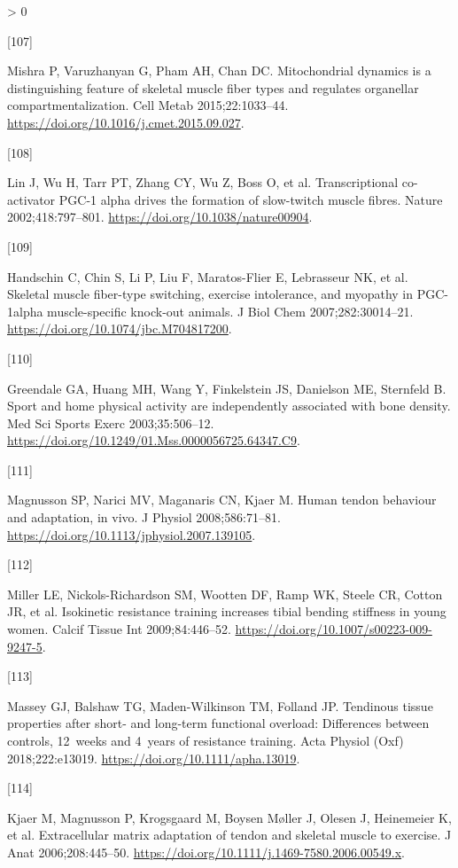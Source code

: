\documentclass[twoside,10pt]{gihclass} %
\newlength{\cslhangindent}
\newlength{\csllabelwidth}
\newenvironment{CSLReferences}[3] %
 {%
  \setlength{\parindent}{0pt}
  \ifodd #1 \everypar{\setlength{\hangindent}{\cslhangindent}}\ignorespaces\fi
  \ifnum #2 > 0
  \setlength{\parskip}{#2\baselineskip}
  \fi
 }%
 {}
\newcommand{\CSLLeftMargin}[1]{\parbox[t]{\maxof{\widthof{#1}}{\csllabelwidth}}{#1}}
\newcommand{\CSLRightInline}[1]{\parbox[t]{\linewidth}{#1}}
\begin{document}
\begin{CSLReferences}{0}{0}
\leavevmode\hypertarget{ref-RN2816}{}%
\CSLLeftMargin{{[}107{]} }
\CSLRightInline{Mishra P, Varuzhanyan G, Pham AH, Chan DC. Mitochondrial dynamics is a distinguishing feature of skeletal muscle fiber types and regulates organellar compartmentalization. Cell Metab 2015;22:1033--44. \url{https://doi.org/10.1016/j.cmet.2015.09.027}.}

\leavevmode\hypertarget{ref-RN2818}{}%
\CSLLeftMargin{{[}108{]} }
\CSLRightInline{Lin J, Wu H, Tarr PT, Zhang CY, Wu Z, Boss O, et al. Transcriptional co-activator PGC-1 alpha drives the formation of slow-twitch muscle fibres. Nature 2002;418:797--801. \url{https://doi.org/10.1038/nature00904}.}

\leavevmode\hypertarget{ref-RN2819}{}%
\CSLLeftMargin{{[}109{]} }
\CSLRightInline{Handschin C, Chin S, Li P, Liu F, Maratos-Flier E, Lebrasseur NK, et al. Skeletal muscle fiber-type switching, exercise intolerance, and myopathy in PGC-1alpha muscle-specific knock-out animals. J Biol Chem 2007;282:30014--21. \url{https://doi.org/10.1074/jbc.M704817200}.}

\leavevmode\hypertarget{ref-RN2775}{}%
\CSLLeftMargin{{[}110{]} }
\CSLRightInline{Greendale GA, Huang MH, Wang Y, Finkelstein JS, Danielson ME, Sternfeld B. Sport and home physical activity are independently associated with bone density. Med Sci Sports Exerc 2003;35:506--12. \url{https://doi.org/10.1249/01.Mss.0000056725.64347.C9}.}

\leavevmode\hypertarget{ref-RN2771}{}%
\CSLLeftMargin{{[}111{]} }
\CSLRightInline{Magnusson SP, Narici MV, Maganaris CN, Kjaer M. Human tendon behaviour and adaptation, in vivo. J Physiol 2008;586:71--81. \url{https://doi.org/10.1113/jphysiol.2007.139105}.}

\leavevmode\hypertarget{ref-RN2774}{}%
\CSLLeftMargin{{[}112{]} }
\CSLRightInline{Miller LE, Nickols-Richardson SM, Wootten DF, Ramp WK, Steele CR, Cotton JR, et al. Isokinetic resistance training increases tibial bending stiffness in young women. Calcif Tissue Int 2009;84:446--52. \url{https://doi.org/10.1007/s00223-009-9247-5}.}

\leavevmode\hypertarget{ref-RN2772}{}%
\CSLLeftMargin{{[}113{]} }
\CSLRightInline{Massey GJ, Balshaw TG, Maden-Wilkinson TM, Folland JP. Tendinous tissue properties after short- and long-term functional overload: Differences between controls, 12~weeks and 4~years of resistance training. Acta Physiol (Oxf) 2018;222:e13019. \url{https://doi.org/10.1111/apha.13019}.}

\leavevmode\hypertarget{ref-RN2770}{}%
\CSLLeftMargin{{[}114{]} }
\CSLRightInline{Kjaer M, Magnusson P, Krogsgaard M, Boysen Møller J, Olesen J, Heinemeier K, et al. Extracellular matrix adaptation of tendon and skeletal muscle to exercise. J Anat 2006;208:445--50. \url{https://doi.org/10.1111/j.1469-7580.2006.00549.x}.}


\end{CSLReferences}
\end{document}

